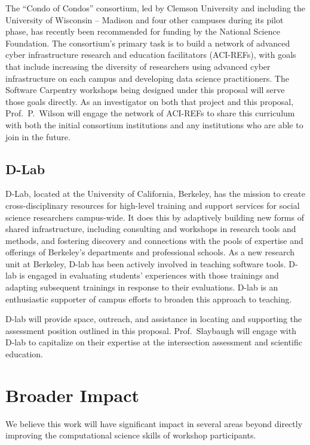 \documentclass{proposalnsf}
\newlength{\up}
\begin{document}
The ``Condo of Condos'' consortium, led by Clemson University and
including the University of Wisconsin -- Madison and four other
campuses during its pilot phase, has recently been recommended for
funding by the National Science Foundation.  The consortium's primary
task is to build a network of advanced cyber infrastructure research
and education facilitators (ACI-REFs), with goals that include
increasing the diversity of researchers using advanced
cyber infrastructure on each campus and developing data science
practitioners.  The Software Carpentry workshops being designed under
this proposal will serve those goals directly.  As an investigator on
both that project and this proposal, Prof.\ P.\ Wilson will engage the
network of ACI-REFs to share this curriculum with both the initial
consortium institutions and any institutions who are able to join in
the future.

\subsection{D-Lab}
\label{sec:dlab}

D-Lab, located at the University of California, Berkeley, has the mission to create cross-disciplinary resources for high-level training and support services for social science researchers campus-wide. It does this by adaptively building new forms of shared infrastructure, including consulting and workshops in research tools and methods, and fostering discovery and connections with the pools of expertise and offerings of Berkeley's departments and professional schools. As a new research unit at Berkeley, D-lab has been actively involved in teaching software tools. D-lab is engaged in evaluating students’ experiences with those trainings and adapting subsequent trainings in response to their evaluations. D-lab is an enthusiastic supporter of campus efforts to broaden this approach to teaching.

D-lab will provide space, outreach, and assistance in locating and supporting the assessment position outlined in this proposal. Prof.\ Slaybaugh will engage with D-lab to capitalize on their expertise at the intersection assessment and scientific education. 

\section{Broader Impact}

We believe this work will have significant impact in several areas
beyond directly improving the computational science skills of workshop
participants.
\end{document}
